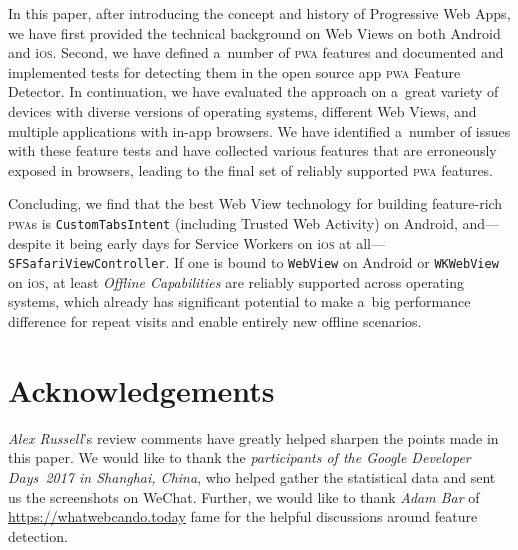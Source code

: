\documentclass[sigconf]{acmart}
\begin{document}
In this paper, after introducing the concept and history of Progressive Web Apps,
we have first provided the technical background on Web Views
on both Android and i\textsc{os}.
Second, we have defined a~number of \textsc{pwa} features
and documented and implemented tests for detecting them
in the open source app \textsc{pwa} Feature Detector. 
In continuation, we have evaluated the approach on a~great variety of devices
with diverse versions of operating systems, different Web Views,
and multiple applications with in-app browsers.
We have identified a~number of issues with these feature tests
and have collected various features that are erroneously exposed in browsers,
leading to the final set of reliably supported \textsc{pwa} features.

Concluding, we find that the best Web View technology for building feature-rich
\textsc{pwa}s is \texttt{CustomTabsIntent} (including Trusted Web Activity) on Android,
and---despite it being early days for Service Workers on i\textsc{os}
at all---\texttt{SFSafariViewController}.
If one is bound to \texttt{WebView} on Android or \texttt{WKWebView} on i\textsc{os},
at least \emph{Offline Capabilities} are reliably supported across operating systems,
which already has significant potential to make a~big performance difference
for repeat visits and enable entirely new offline scenarios.

\section*{Acknowledgements}

\emph{Alex Russell}'s review comments have greatly helped sharpen the points made in this paper.
We would like to thank the \emph{participants of the Google Developer Days~2017 in Shanghai, China},
who helped gather the statistical data and sent us
the screenshots on WeChat.
Further, we would like to thank \emph{Adam Bar} of \url{https://whatwebcando.today} fame
for the helpful discussions around feature detection.
\end{document}
